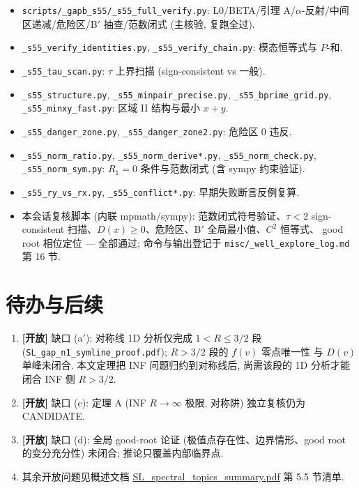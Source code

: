 \documentclass[UTF8]{ctexart}
\newcommand{\OPEN}{\textbf{[开放]}}
\begin{document}
\begin{itemize}
	\item \texttt{scripts/\_gapb\_s55/\_s55\_full\_verify.py}:
		L0/BETA/引理 A/$\alpha$-反射/中间区递减/危险区/B$'$ 抽查/范数闭式
		(主核验, 复跑全过).
	\item \texttt{\_s55\_verify\_identities.py}, \texttt{\_s55\_verify\_chain.py}:
		模态恒等式与 $P$-和.
	\item \texttt{\_s55\_tau\_scan.py}: $\tau$ 上界扫描 (sign-consistent vs 一般).
	\item \texttt{\_s55\_structure.py}, \texttt{\_s55\_minpair\_precise.py},
		\texttt{\_s55\_bprime\_grid.py}, \texttt{\_s55\_minxy\_fast.py}:
		区域 II 结构与最小 $x+y$.
	\item \texttt{\_s55\_danger\_zone.py}, \texttt{\_s55\_danger\_zone2.py}:
		危险区 0 违反.
	\item \texttt{\_s55\_norm\_ratio.py}, \texttt{\_s55\_norm\_derive*.py},
		\texttt{\_s55\_norm\_check.py}, \texttt{\_s55\_norm\_sym.py}:
		$R_1=0$ 条件与范数闭式 (含 sympy 约束验证).
	\item \texttt{\_s55\_ry\_vs\_rx.py}, \texttt{\_s55\_conflict*.py}:
		早期失败断言反例复算.
	\item 本会话复核脚本 (内联 mpmath/sympy): 范数闭式符号验证、$\tau<2$
		sign-consistent 扫描、$D(x)\ge0$、危险区、B$'$ 全局最小值、$C^2$ 恒等式、
		good root 相位定位 --- 全部通过; 命令与输出登记于
		\texttt{misc/\_well\_explore\_log.md} 第 16 节.
\end{itemize}

\section{待办与后续}

\begin{enumerate}
	\item \OPEN{} 缺口 (a$'$): 对称线 1D 分析仅完成 $1<R\le3/2$ 段
		(\texttt{SL\_gap\_n1\_symline\_proof.pdf}); $R>3/2$ 段的 $f(v)$ 零点唯一性
		与 $D(v)$ 单峰未闭合. 本文定理把 INF 问题归约到对称线后, 尚需该段的
		1D 分析才能闭合 INF 侧 $R>3/2$.
	\item \OPEN{} 缺口 (c): 定理 A (INF $R\to\infty$ 极限, 对称阱) 独立复核仍为
		CANDIDATE.
	\item \OPEN{} 缺口 (d): 全局 good-root 论证 (极值点存在性、边界情形、good
		root 的变分充分性) 未闭合; 推论只覆盖内部临界点.
	\item 其余开放问题见概述文档 \url{SL_spectral_topics_summary.pdf}
		第 5.5 节清单.
\end{enumerate}
\end{document}
